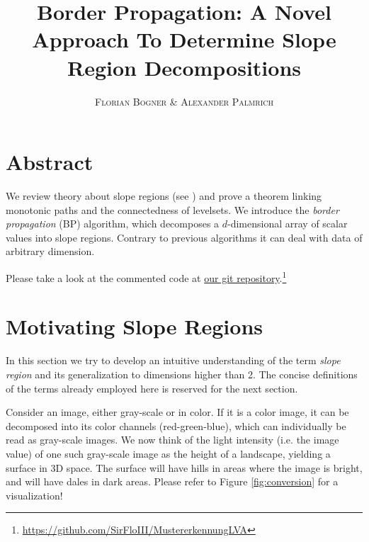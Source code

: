 \documentclass[a4paper,12pt,notitlepage,fullpage]{paper}
\makeatletter
\theoremstyle{plain}
\theoremstyle{definition}
\newcommand*{\toccontents}{\@starttoc{toc}}
\makeatother
\begin{document}
\author{\textsc{Florian Bogner} \& \textsc{Alexander Palmrich}}
\title{Border Propagation: A Novel Approach To Determine Slope Region Decompositions}
\maketitle

\toccontents
%
%
%

\section{Abstract}

We review theory about slope regions (see \cite{kropatsch2019space}) and prove a theorem linking monotonic paths and the connectedness of levelsets. We introduce the \emph{border propagation} (BP) algorithm, which decomposes a $d$-dimensional array of scalar values into slope regions. Contrary to previous algorithms it can deal with data of arbitrary dimension.



Please take a look at the commented code at \href{https://github.com/SirFloIII/MustererkennungLVA}{our git repository}.\footnote{\url{https://github.com/SirFloIII/MustererkennungLVA}}

\section{Motivating Slope Regions}
\label{sec:motivating_slope_regions}

In this section we try to develop an intuitive understanding of the term \emph{slope region} and its generalization to dimensions higher than 2. The concise definitions of the terms already employed here is reserved for the next section.

Consider an image, either gray-scale or in color. If it is a color image, it can be decomposed into its color channels (red-green-blue), which can individually be read as gray-scale images. We now think of the light intensity (i.e. the image value) of one such gray-scale image as the height of a landscape, yielding a surface in 3D space. The surface will have hills in areas where the image is bright, and will have dales in dark areas. Please refer to Figure \ref{fig:conversion} for a visualization!
\end{document}
